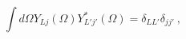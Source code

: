 \begin{equation}\label{ortho}
\int d\Omega Y_{Lj}(\Omega)Y^*_{L'j'}(\Omega)=
\delta_{LL'}\delta_{jj'} \ ,
\end{equation}

